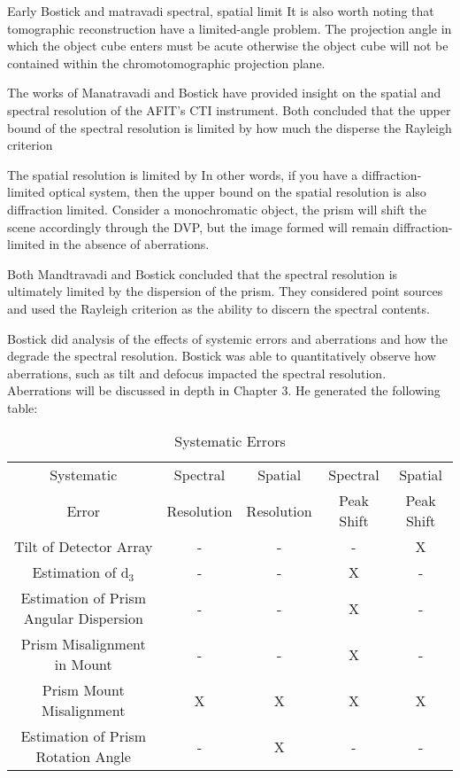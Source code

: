 Early Bostick and matravadi spectral, spatial limit
It is also worth noting that tomographic reconstruction have a limited-angle problem. The projection angle in which the object cube enters must be acute otherwise the object cube will not be contained within the chromotomographic projection plane.

The works of Manatravadi and Bostick have provided insight on the spatial and spectral resolution of the AFIT's CTI instrument. Both concluded that the upper bound of the spectral resolution is limited by how much the disperse the Rayleigh criterion

The spatial resolution is limited by
 In other words, if you have a diffraction-limited optical system, then the upper bound on the spatial resolution is also diffraction limited. Consider a monochromatic object, the prism will shift the scene accordingly through the \ac{DVP}, but the image formed will remain diffraction-limited in the absence of aberrations.

Both Mandtravadi and Bostick concluded that the spectral resolution is ultimately limited by the dispersion of the prism. They considered point sources and used the Rayleigh criterion\cite{Hecht} as the ability to discern the spectral contents.

Bostick did analysis of the effects of systemic errors and aberrations and how the degrade the spectral resolution. Bostick was able to quantitatively observe how aberrations, such as tilt and defocus impacted the spectral resolution. Aberrations will be discussed in depth in Chapter 3. He generated the following table:

\begin{table}[htb] 
\label{tbl:systemErrors} %
\caption{Systematic Errors} %
\centering %
\begin{tabular}{| c | c | c | c | c| } %
\hline
Systematic & Spectral  & Spatial & Spectral & Spatial \\ 
Error & Resolution & Resolution & Peak Shift &  Peak Shift \\
\hline %
Tilt of Detector Array & - & - & - & X \\
Estimation of $\mathrm{d}_3$ & - & - & X & - \\
Estimation of Prism Angular Dispersion & - & - & X & - \\
Prism Misalignment in Mount & - & - & X & - \\
Prism Mount Misalignment & X & X & X & X \\
Estimation of Prism Rotation Angle & - & X & - & - \\
\hline %
\end{tabular} 
\end{table}

